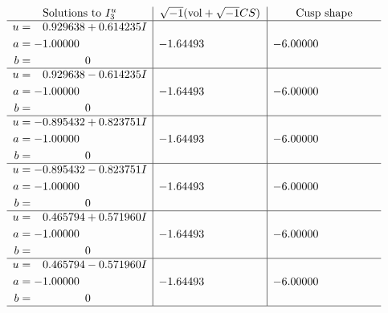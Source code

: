 \documentclass[1p]{elsarticle_modified}
\theoremstyle{definition}
\newcommand{\I}{\sqrt{-1}}
\begin{document}
$$\begin{array}{c|c|c}  
\text{Solutions to }I^u_{3}& \I (\text{vol} + \sqrt{-1}CS) & \text{Cusp shape}\\
 \hline 
\begin{aligned}
u &= \phantom{-}0.929638 + 0.614235 I \\
a &= -1.00000\phantom{ +0.000000I} \\
b &= \phantom{-0.000000 } 0\end{aligned}
 & -1.64493\phantom{ +0.000000I} & -6.00000\phantom{ +0.000000I} \\ \hline\begin{aligned}
u &= \phantom{-}0.929638 - 0.614235 I \\
a &= -1.00000\phantom{ +0.000000I} \\
b &= \phantom{-0.000000 } 0\end{aligned}
 & -1.64493\phantom{ +0.000000I} & -6.00000\phantom{ +0.000000I} \\ \hline\begin{aligned}
u &= -0.895432 + 0.823751 I \\
a &= -1.00000\phantom{ +0.000000I} \\
b &= \phantom{-0.000000 } 0\end{aligned}
 & -1.64493\phantom{ +0.000000I} & -6.00000\phantom{ +0.000000I} \\ \hline\begin{aligned}
u &= -0.895432 - 0.823751 I \\
a &= -1.00000\phantom{ +0.000000I} \\
b &= \phantom{-0.000000 } 0\end{aligned}
 & -1.64493\phantom{ +0.000000I} & -6.00000\phantom{ +0.000000I} \\ \hline\begin{aligned}
u &= \phantom{-}0.465794 + 0.571960 I \\
a &= -1.00000\phantom{ +0.000000I} \\
b &= \phantom{-0.000000 } 0\end{aligned}
 & -1.64493\phantom{ +0.000000I} & -6.00000\phantom{ +0.000000I} \\ \hline\begin{aligned}
u &= \phantom{-}0.465794 - 0.571960 I \\
a &= -1.00000\phantom{ +0.000000I} \\
b &= \phantom{-0.000000 } 0\end{aligned}
 & -1.64493\phantom{ +0.000000I} & -6.00000\phantom{ +0.000000I}\\
 \hline 
 \end{array}$$\newpage\newpage\renewcommand{\arraystretch}{1}
\end{document}
